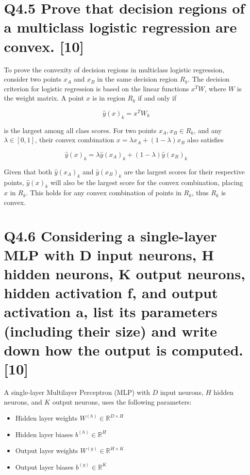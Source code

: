 \documentclass[11pt]{article}
\begin{document}
\section{Q4.5 Prove that decision regions of a multiclass logistic regression are convex. [10]}

To prove the convexity of decision regions in multiclass logistic regression, consider two points \( x_A \) and \( x_B \) in the same decision region \( R_k \). The decision criterion for logistic regression is based on the linear functions \( x^T W \), where \( W \) is the weight matrix. A point \( x \) is in region \( R_k \) if and only if

\[ \hat{y}(x)_k = x^T W_k \]

is the largest among all class scores. For two points \( x_A, x_B \in R_k \), and any \( \lambda \in [0, 1] \), their convex combination \( x = \lambda x_A + (1 - \lambda)x_B \) also satisfies

\[ \hat{y}(x)_k = \lambda \hat{y}(x_A)_k + (1 - \lambda)\hat{y}(x_B)_k \]

Given that both \( \hat{y}(x_A)_k \) and \( \hat{y}(x_B)_k \) are the largest scores for their respective points, \( \hat{y}(x)_k \) will also be the largest score for the convex combination, placing \( x \) in \( R_k \). This holds for any convex combination of points in \( R_k \), thus \( R_k \) is convex.


\section{Q4.6 Considering a single-layer MLP with D input neurons, H hidden neurons, K output neurons, hidden activation f, and output activation a, list its parameters (including their size) and write down how the output is computed. [10]}

A single-layer Multilayer Perceptron (MLP) with \( D \) input neurons, \( H \) hidden neurons, and \( K \) output neurons, uses the following parameters:

\begin{itemize}
    \item Hidden layer weights \( W^{(h)} \in \mathbb{R}^{D \times H} \)
    \item Hidden layer biases \( b^{(h)} \in \mathbb{R}^{H} \)
    \item Output layer weights \( W^{(y)} \in \mathbb{R}^{H \times K} \)
    \item Output layer biases \( b^{(y)} \in \mathbb{R}^{K} \)
\end{itemize}
\end{document}

